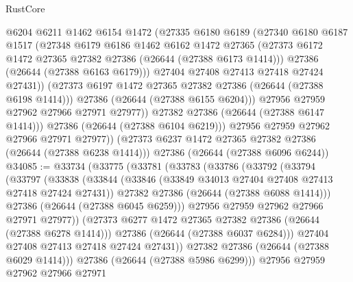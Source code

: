 \begin{lexlean}{RustCore}
\begin{coremodule}
                  @6204
                  @6211
                  @1462
                  @6154
                  @1472
                  (@27335
                    @6180
                    @6189
                    (@27340
                      @6180
                      @6187
                      @1517
                      (@27348
                        @6179
                        @6186
                        @1462
                        @6162
                        @1472
                        @27365
                        (@27373 @6172 @1472 @27365 @27382 @27386 (@26644 (@27388 @6173 @1414)))
                        @27386
                        (@26644 (@27388 @6163 @6179)))
                      @27404
                      @27408
                      @27413
                      @27418
                      @27424
                      @27431))
                  (@27373 @6197 @1472 @27365 @27382 @27386 (@26644 (@27388 @6198 @1414)))
                  @27386
                  (@26644 (@27388 @6155 @6204)))
                @27956
                @27959
                @27962
                @27966
                @27971
                @27977))
            @27382
            @27386
            (@26644 (@27388 @6147 @1414)))
          @27386
          (@26644 (@27388 @6104 @6219)))
        @27956
        @27959
        @27962
        @27966
        @27971
        @27977))
    (@27373 @6237 @1472 @27365 @27382 @27386 (@26644 (@27388 @6238 @1414)))
    @27386
    (@26644 (@27388 @6096 @6244))
@34085 := @33734
    (@33775
      (@33781
        (@33783
          (@33786
            (@33792
              (@33794
                (@33797
                  (@33838
                    (@33844
                      (@33846 (@33849 @34013 @27404 @27408 @27413 @27418 @27424 @27431))
                      @27382
                      @27386
                      (@26644 (@27388 @6088 @1414)))
                    @27386
                    (@26644 (@27388 @6045 @6259)))
                  @27956
                  @27959
                  @27962
                  @27966
                  @27971
                  @27977))
              (@27373 @6277 @1472 @27365 @27382 @27386 (@26644 (@27388 @6278 @1414)))
              @27386
              (@26644 (@27388 @6037 @6284)))
            @27404
            @27408
            @27413
            @27418
            @27424
            @27431))
        @27382
        @27386
        (@26644 (@27388 @6029 @1414)))
      @27386
      (@26644 (@27388 @5986 @6299)))
    @27956
    @27959
    @27962
    @27966
    @27971

\end{coremodule}
\end{lexlean}
